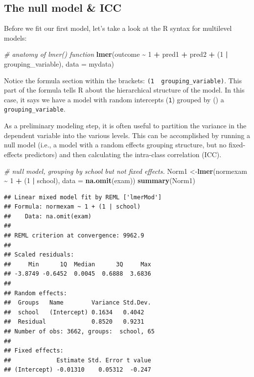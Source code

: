 \documentclass[
]{book}
\newenvironment{Shaded}{\begin{snugshade}}{\end{snugshade}}
\newcommand{\CommentTok}[1]{\textcolor[rgb]{0.56,0.35,0.01}{\textit{#1}}}
\newcommand{\DataTypeTok}[1]{\textcolor[rgb]{0.13,0.29,0.53}{#1}}
\newcommand{\DecValTok}[1]{\textcolor[rgb]{0.00,0.00,0.81}{#1}}
\newcommand{\KeywordTok}[1]{\textcolor[rgb]{0.13,0.29,0.53}{\textbf{#1}}}
\newcommand{\NormalTok}[1]{#1}
\newcommand{\OperatorTok}[1]{\textcolor[rgb]{0.81,0.36,0.00}{\textbf{#1}}}
\newcommand{\StringTok}[1]{\textcolor[rgb]{0.31,0.60,0.02}{#1}}
\begin{document}
\hypertarget{the-null-model-icc}{%
\subsection{The null model \& ICC}\label{the-null-model-icc}}

Before we fit our first model, let's take a look at the R syntax for multilevel models:

\begin{Shaded}
\begin{Highlighting}[]
  \CommentTok{\# anatomy of lmer() function}
  \KeywordTok{lmer}\NormalTok{(outcome }\OperatorTok{\textasciitilde{}}\StringTok{ }\DecValTok{1} \OperatorTok{+}\StringTok{ }\NormalTok{pred1 }\OperatorTok{+}\StringTok{ }\NormalTok{pred2 }\OperatorTok{+}\StringTok{ }\NormalTok{(}\DecValTok{1} \OperatorTok{|}\StringTok{ }\NormalTok{grouping\_variable), }
       \DataTypeTok{data =}\NormalTok{ mydata)}
\end{Highlighting}
\end{Shaded}

Notice the formula section within the brackets: \texttt{(1\ \textbar{}\ grouping\_variable)}. This part of the formula tells R about the hierarchical structure of the model. In this case, it says we have a model with random intercepts (\texttt{1}) grouped by (\texttt{\textbar{}}) a \texttt{grouping\_variable}.

As a preliminary modeling step, it is often useful to partition the variance in the dependent variable into the various levels. This can be accomplished by running a null model (i.e., a model with a random effects grouping structure, but no fixed-effects predictors) and then calculating the intra-class correlation (ICC).

\begin{Shaded}
\begin{Highlighting}[]
  \CommentTok{\# null model, grouping by school but not fixed effects.}
\NormalTok{  Norm1 \textless{}{-}}\KeywordTok{lmer}\NormalTok{(normexam }\OperatorTok{\textasciitilde{}}\StringTok{ }\DecValTok{1} \OperatorTok{+}\StringTok{ }\NormalTok{(}\DecValTok{1} \OperatorTok{|}\StringTok{ }\NormalTok{school), }
               \DataTypeTok{data =} \KeywordTok{na.omit}\NormalTok{(exam))}
  \KeywordTok{summary}\NormalTok{(Norm1)}
\end{Highlighting}
\end{Shaded}

\begin{verbatim}
## Linear mixed model fit by REML ['lmerMod']
## Formula: normexam ~ 1 + (1 | school)
##    Data: na.omit(exam)
## 
## REML criterion at convergence: 9962.9
## 
## Scaled residuals: 
##     Min      1Q  Median      3Q     Max 
## -3.8749 -0.6452  0.0045  0.6888  3.6836 
## 
## Random effects:
##  Groups   Name        Variance Std.Dev.
##  school   (Intercept) 0.1634   0.4042  
##  Residual             0.8520   0.9231  
## Number of obs: 3662, groups:  school, 65
## 
## Fixed effects:
##             Estimate Std. Error t value
## (Intercept) -0.01310    0.05312  -0.247
\end{verbatim}
\end{document}
